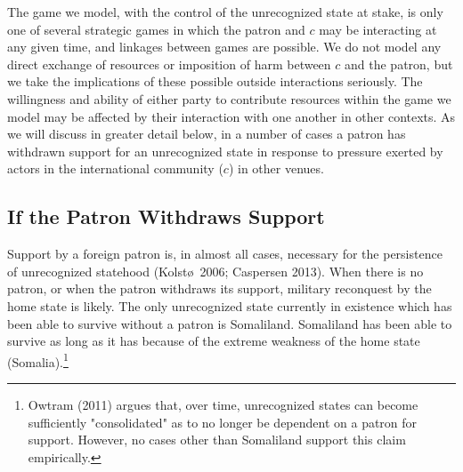 \documentclass[11pt,letterpaper, notitlepage]{article}
\begin{document}
The game we model, with the control of the unrecognized state at stake, is only one of several strategic games in which the patron and $c$ may be interacting at any given time, and linkages between games are possible. We do not model any direct exchange of resources or imposition of harm between $c$ and the patron, but we take the implications of these possible outside interactions seriously. The willingness and ability of either party to contribute resources within the game we model may be affected by their interaction with one another in other contexts. As we will discuss in greater detail below, in a number of cases a patron has withdrawn support for an unrecognized state in response to pressure exerted by actors in the international community ($c$) in other venues.


\subsection{If the Patron Withdraws Support}
Support by a foreign patron is, in almost all cases, necessary for the persistence of unrecognized statehood (Kolst\o \ 2006; Caspersen 2013). When there is no patron, or when the patron withdraws its support, military reconquest by the home state is likely. The only unrecognized state currently in existence which has been able to survive without a patron is Somaliland. Somaliland has been able to survive as long as it has because of the extreme weakness of the home state (Somalia).\footnote{Owtram (2011) argues that, over time, unrecognized states can become sufficiently "consolidated" as to no longer be dependent on a patron for support. However, no cases other than Somaliland support this claim empirically.}

\end{document}
